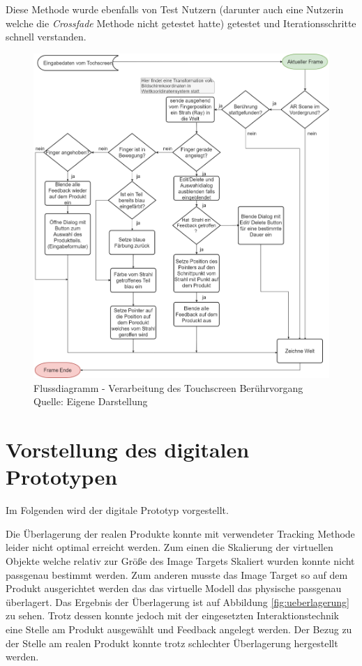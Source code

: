 Diese Methode wurde ebenfalls von Test Nutzern (darunter auch eine Nutzerin welche die \textit{Crossfade} Methode nicht getestet hatte) getestet und Iterationsschritte schnell verstanden. 

\begin{figure}[H]
	\centering
	\includegraphics[width=1.0\textwidth]{resources/implementation/flussdiagram_selection.png}
	\caption{Flussdiagramm - Verarbeitung des Touchscreen Berührvorgang \\Quelle: Eigene Darstellung}
	\label{img:flow}
\end{figure}

\section{Vorstellung des digitalen Prototypen}

Im Folgenden wird der digitale Prototyp vorgestellt. 

Die Überlagerung der realen Produkte konnte mit verwendeter Tracking Methode leider nicht optimal erreicht werden. Zum einen die Skalierung der virtuellen Objekte welche relativ zur 
Größe des Image Targets Skaliert wurden konnte nicht passgenau bestimmt werden. Zum anderen musste das Image Target so auf dem Produkt ausgerichtet werden das das virtuelle Modell das 
physische passgenau überlagert. Das Ergebnis der Überlagerung ist auf Abbildung \ref{fig:ueberlagerung} zu sehen. Trotz dessen konnte jedoch mit der eingesetzten Interaktionstechnik 
eine Stelle am Produkt ausgewählt und Feedback angelegt werden. Der Bezug zu der Stelle am realen Produkt konnte trotz schlechter Überlagerung hergestellt werden. 

